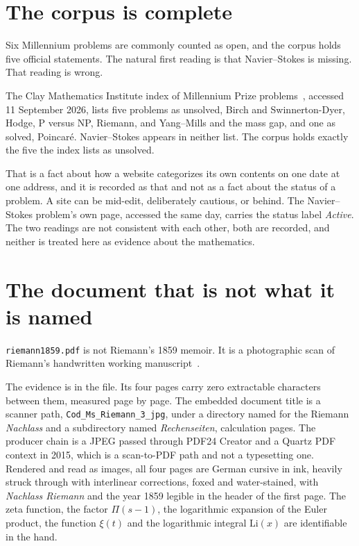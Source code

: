 \section{The corpus is complete}

Six Millennium problems are commonly counted as open, and the corpus holds five official statements.
The natural first reading is that Navier--Stokes is missing. That reading is wrong.

The Clay Mathematics Institute index of Millennium Prize problems~\cite{src:Clay-Mathematics-Institute},
accessed 11 September 2026, lists five problems as unsolved, Birch and Swinnerton-Dyer, Hodge, P
versus NP, Riemann, and Yang--Mills and the mass gap, and one as solved, Poincar\'e. Navier--Stokes
appears in neither list. The corpus holds exactly the five the index lists as unsolved.

That is a fact about how a website categorizes its own contents on one date at one address, and it is
recorded as that and not as a fact about the status of a problem. A site can be mid-edit,
deliberately cautious, or behind. The Navier--Stokes problem's own page, accessed the same day,
carries the status label \emph{Active}. The two readings are not consistent with each other, both
are recorded, and neither is treated here as evidence about the mathematics.

\section{The document that is not what it is named}

\texttt{riemann1859.pdf} is not Riemann's 1859 memoir. It is a photographic scan of Riemann's
handwritten working manuscript~\cite{src:Riemann-1859}.

The evidence is in the file. Its four pages carry zero extractable characters between them, measured
page by page. The embedded document title is a scanner path,
\texttt{Cod\_\allowbreak{}Ms\_\allowbreak{}Riemann\_\allowbreak{}3\_\allowbreak{}jpg}, under a
directory named for the Riemann \emph{Nachlass} and a subdirectory named \emph{Rechenseiten},
calculation pages. The producer chain is a JPEG passed through PDF24 Creator and a Quartz PDF context
in 2015, which is a scan-to-PDF path and not a typesetting one. Rendered and read as images, all four
pages are German cursive in ink, heavily struck through with interlinear corrections, foxed and
water-stained, with \emph{Nachlass Riemann} and the year 1859 legible in the header of the first
page. The zeta function, the factor $\Pi(s-1)$, the logarithmic expansion of the Euler product, the
function $\xi(t)$ and the logarithmic integral $\mathrm{Li}(x)$ are identifiable in the hand.

